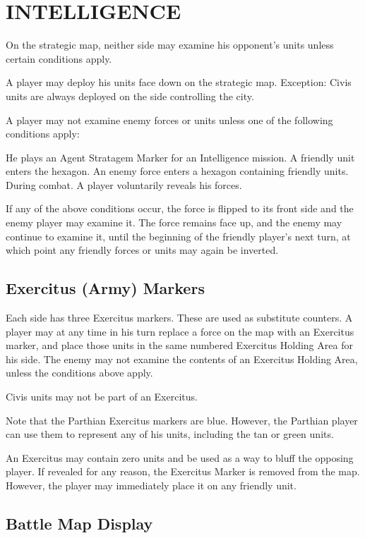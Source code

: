 \section{INTELLIGENCE}

On the strategic map, neither side may examine his opponent's units unless certain conditions apply.

A player may deploy his units face down on the strategic map. Exception: Civis units are always deployed on the side controlling the city.

A player may not examine enemy forces or units unless one of the following conditions apply:

He plays an Agent Stratagem Marker for an Intelligence mission.
A friendly unit enters the hexagon.
An enemy force enters a hexagon containing friendly units.
During combat.
A player voluntarily reveals his forces.

If any of the above conditions occur, the force is flipped to its front side and the enemy player may examine it. The force remains face up, and the enemy may continue to examine it, until the beginning of the friendly player's next turn, at which point any friendly forces or units may again be inverted.

\subsection{Exercitus (Army) Markers}

Each side has three Exercitus markers. These are used as substitute counters. A player may at any time in his turn replace a force on the map with an Exercitus marker, and place those units in the same numbered Exercitus Holding Area for his side. The enemy may not examine the contents of an Exercitus Holding Area, unless the conditions above apply.

Civis units may not be part of an Exercitus.

Note that the Parthian Exercitus markers are blue. However, the Parthian player can use them to represent any of his units, including the tan or green units.

An Exercitus may contain zero units and be used as a way to bluff the opposing player. If revealed for any reason, the Exercitus Marker is removed from the map. However, the player may immediately place it on any friendly unit.

\subsection{Battle Map Display}

